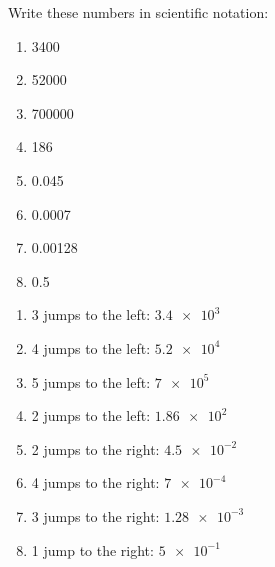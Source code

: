 \begin{exercise}
    Write these numbers in scientific notation:
    \begin{enumerate}[label=\letraminuscula]
        \item \num{3400}
        \item \num{52000}
        \item \num{700000}
        \item \num{186}
        \item \num{0.045}
        \item \num{0.0007}
        \item \num{0.00128}
        \item \num{0.5}
    \end{enumerate}
    \begin{solu}
        \begin{enumerate}[label=\alph*)]
            \item 3 jumps to the left: \(\num{3.4e3}\)
            \item 4 jumps to the left: \(\num{5.2e4}\)
            \item 5 jumps to the left: \(\num{7e5}\)
            \item 2 jumps to the left: \(\num{1.86e2}\)
            \item 2 jumps to the right: \(\num{4.5e-2}\)
            \item 4 jumps to the right: \(\num{7e-4}\)
            \item 3 jumps to the right: \(\num{1.28e-3}\)
            \item 1 jump to the right: \(\num{5e-1}\)
        \end{enumerate}
    \end{solu}
\end{exercise}


